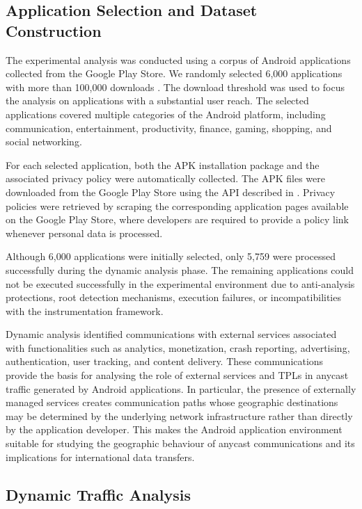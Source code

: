 \documentclass[
A4paper,                %
twoside,                %
openright,              %
chapterprefix=true,     %
12pt,                   %
headings=normal,        %
titlepage=on            %
]{book}
\providecommand{\DIFaddtex}[1]{{\protect\color{blue}\uwave{#1}}} %
\providecommand{\DIFaddbegin}{} %
\providecommand{\DIFaddend}{} %
\providecommand{\DIFadd}[1]{\texorpdfstring{\DIFaddtex{#1}}{#1}} %
\providecommand{\DIFaddincludegraphics}[2][]{{\color{blue}\fbox{\DIFOincludegraphics[#1]{#2}}}} %
\DeclareRobustCommand{\DIFaddbegin}{\DIFOaddbegin \let\includegraphics\DIFaddincludegraphics} %
\DeclareRobustCommand{\DIFaddend}{\DIFOaddend \let\includegraphics\DIFOincludegraphics} %
\begin{document}
\subsection{Application Selection and Dataset Construction}
\label{sc:anycast_experiments_dataset}

The experimental analysis was conducted using a corpus of Android applications collected from the Google Play Store. We randomly selected 6,000 applications with more than 100,000 downloads \cite{Pascual2025AnycastDisaster}. The download threshold was used to focus the analysis on applications with a substantial user reach. The selected applications covered multiple categories of the Android platform, including communication, entertainment, productivity, finance, gaming, shopping, and social networking.

For each selected application, both the APK installation package and the associated privacy policy were automatically collected. The APK files were downloaded from the Google Play Store using the API described in \cite{Marty0678/googleplay-api:API}. Privacy policies were retrieved by scraping the corresponding application pages available on the Google Play Store, where developers are required to provide a policy link whenever personal data is processed.

Although 6,000 applications were initially selected, only 5,759 were processed successfully during the dynamic analysis phase. The remaining applications could not be executed successfully in the experimental environment due to anti-analysis protections, root detection mechanisms, execution failures, or incompatibilities with the instrumentation framework.

Dynamic analysis identified communications with external services associated with functionalities such as analytics, monetization, crash reporting, advertising, authentication, user tracking, and content delivery. These communications provide the basis for analysing the role of external services and TPLs in anycast traffic generated by Android applications. In particular, the presence of externally managed services creates communication paths whose geographic destinations may be determined by the underlying network infrastructure rather than directly by the application developer. This makes the Android application environment suitable for studying the geographic behaviour of anycast communications and its implications for \DIFaddbegin \DIFadd{potential }\DIFaddend international data transfers.

\subsection{Dynamic Traffic Analysis}
\label{sc:anycast_experiments_traffic_collection}
\end{document}
